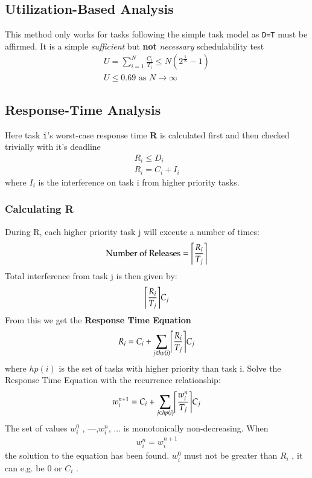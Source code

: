 \subsection{Utilization-Based Analysis}
This method only works for tasks following the simple task model as \texttt{D=T} must be affirmed. It is a simple \textit{sufficient} but \textbf{not} \textit{necessary} schedulability test
\begin{align}
U = \sum_{i=1}^N\frac{C_i}{T_i}\leq N(2^\frac{1}{N}-1) \\
U\leq 0.69 \text{ as } N\to\infty
\end{align}

\subsection{Response-Time Analysis}
Here task \texttt{i}'s worst-case response time \textbf{R} is calculated first and then checked trivially with it's deadline 
\begin{align}
R_i\leq D_i \\
R_i = C_i + I_i
\end{align}
where $I_i$ is the interference on task i from higher priority tasks.

\subsubsection{Calculating R}
During R, each higher priority task j will execute a number of times:
\begin{align}
\text{Number of Releases}=\ceil*{\frac{R_i}{T_j}}
\end{align}
Total interference from task j is then given by:
\begin{align}
    \ceil*{\frac{R_i}{T_j}}C_j
\end{align}
From this we get the \textbf{Response Time Equation}
\begin{align}
R_i = C_i +\sum_{j\in hp(i)}\ceil*{\frac{R_i}{T_j}}C_j
\end{align}
where $hp(i)$  is the set of tasks with higher priority than task i. Solve the Response Time Equation with the recurrence relationship:
\begin{align}
w_i^{n+1} = C_i + \sum_{j\in hp(i)}\ceil*{\frac{w_i^n}{T_j}}C_j
\end{align}
The set of values $w_i^0$ , ---,$w_i^n$, ... is monotonically non-decreasing. When 
\begin{align}
w_i^n=w_i^{n+1}
\end{align}
the solution to the equation has been found. $w_i^0$ must not be greater than $R_i$ , it can e.g. be 0 or $C_i$ . 


